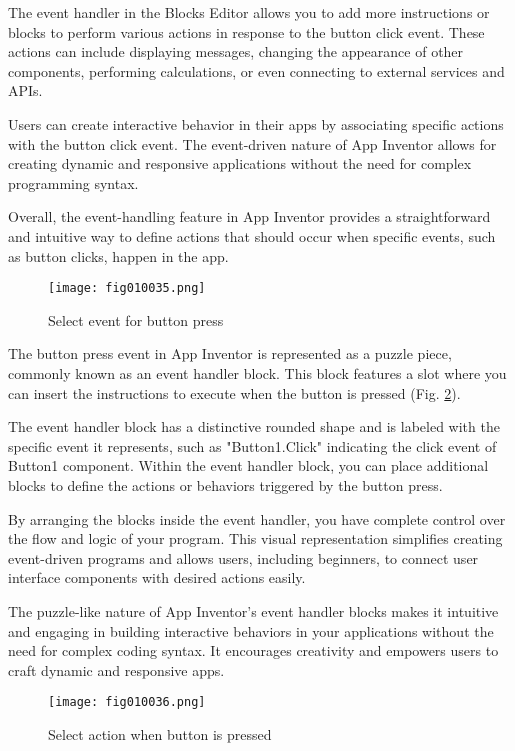 The event handler in the Blocks Editor allows you to add more instructions or blocks to perform various actions in response to the button click event. These actions can include displaying messages, changing the appearance of other components, performing calculations, or even connecting to external services and APIs.

Users can create interactive behavior in their apps by associating specific actions with the button click event. The event-driven nature of App Inventor allows for creating dynamic and responsive applications without the need for complex programming syntax.

Overall, the event-handling feature in App Inventor provides a straightforward and intuitive way to define actions that should occur when specific events, such as button clicks, happen in the app.

\begin{figure}[H]
   \centering
   \texttt{[image: fig010035.png]}
   \caption{Select event for button press}
\label{fig010035}
\end{figure}

The button press event in App Inventor is represented as a puzzle piece, commonly known as an event handler block. This block features a slot where you can insert the instructions to execute when the button is pressed (Fig. \ref{fig010036}).

The event handler block has a distinctive rounded shape and is labeled with the specific event it represents, such as "Button1.Click" indicating the click event of Button1 component. Within the event handler block, you can place additional blocks to define the actions or behaviors triggered by the button press.

By arranging the blocks inside the event handler, you have complete control over the flow and logic of your program. This visual representation simplifies creating event-driven programs and allows users, including beginners, to connect user interface components with desired actions easily.

The puzzle-like nature of App Inventor's event handler blocks makes it intuitive and engaging in building interactive behaviors in your applications without the need for complex coding syntax. It encourages creativity and empowers users to craft dynamic and responsive apps.

\begin{figure}[H]
   \centering
   \texttt{[image: fig010036.png]}
   \caption{Select action when button is pressed}
\label{fig010036}
\end{figure}

